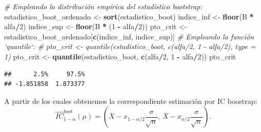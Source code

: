 \documentclass[]{book}
\newenvironment{Shaded}{\begin{snugshade}}{\end{snugshade}}
\newcommand{\KeywordTok}[1]{\textcolor[rgb]{0.13,0.29,0.53}{\textbf{#1}}}
\newcommand{\DecValTok}[1]{\textcolor[rgb]{0.00,0.00,0.81}{#1}}
\newcommand{\StringTok}[1]{\textcolor[rgb]{0.31,0.60,0.02}{#1}}
\newcommand{\CommentTok}[1]{\textcolor[rgb]{0.56,0.35,0.01}{\textit{#1}}}
\newcommand{\OperatorTok}[1]{\textcolor[rgb]{0.81,0.36,0.00}{\textbf{#1}}}
\newcommand{\NormalTok}[1]{#1}
\theoremstyle{definition}
\theoremstyle{definition}
\theoremstyle{definition}
\theoremstyle{remark}
\begin{document}
\begin{Shaded}
\begin{Highlighting}[]
\CommentTok{# Empleando la distribución empírica del estadístico bootstrap: }
\NormalTok{estadistico_boot_ordenado <-}\StringTok{ }\KeywordTok{sort}\NormalTok{(estadistico_boot)}
\NormalTok{indice_inf <-}\StringTok{ }\KeywordTok{floor}\NormalTok{(B }\OperatorTok{*}\StringTok{ }\NormalTok{alfa}\OperatorTok{/}\DecValTok{2}\NormalTok{)}
\NormalTok{indice_sup <-}\StringTok{ }\KeywordTok{floor}\NormalTok{(B }\OperatorTok{*}\StringTok{ }\NormalTok{(}\DecValTok{1} \OperatorTok{-}\StringTok{ }\NormalTok{alfa}\OperatorTok{/}\DecValTok{2}\NormalTok{))}
\NormalTok{pto_crit <-}\StringTok{ }\NormalTok{estadistico_boot_ordenado[}\KeywordTok{c}\NormalTok{(indice_inf, indice_sup)]}
\CommentTok{# Empleando la función `quantile`:}
\CommentTok{# pto_crit <- quantile(estadistico_boot, c(alfa/2, 1 - alfa/2), type = 1)}
\NormalTok{pto_crit <-}\StringTok{ }\KeywordTok{quantile}\NormalTok{(estadistico_boot, }\KeywordTok{c}\NormalTok{(alfa}\OperatorTok{/}\DecValTok{2}\NormalTok{, }\DecValTok{1} \OperatorTok{-}\StringTok{ }\NormalTok{alfa}\OperatorTok{/}\DecValTok{2}\NormalTok{))}
\NormalTok{pto_crit}
\end{Highlighting}
\end{Shaded}

\begin{verbatim}
##      2.5%     97.5% 
## -1.851858  1.873377
\end{verbatim}

A partir de los cuales obtenemos la correspondiente estimación por IC
boostrap: \[\hat{IC}^{boot}_{1-\alpha}\left(  \mu\right)  = 
\left(  \overline{X}-x_{1-\alpha/2}\dfrac{\sigma}{\sqrt{n}},\ \overline{X} 
- x_{\alpha/2}\dfrac{\sigma}{\sqrt{n}} \right).\]

\begin{Shaded}
\end{Shaded}
\end{document}

